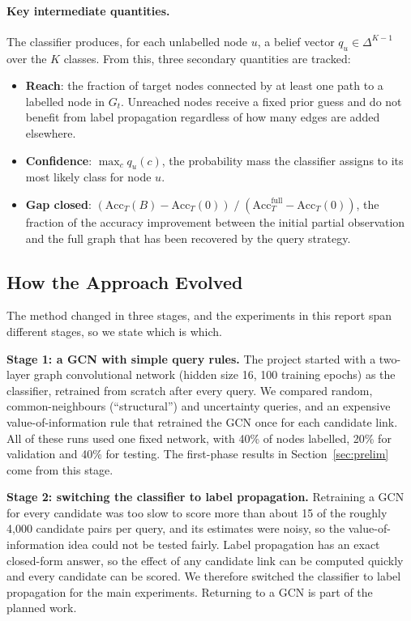 \documentclass[11pt,a4paper]{article}
\begin{document}
\paragraph{Key intermediate quantities.}
The classifier produces, for each unlabelled node $u$, a belief vector $q_u \in \Delta^{K-1}$
over the $K$ classes. From this, three secondary quantities are tracked:
\begin{itemize}[leftmargin=2em,itemsep=0.2em]
\item \textbf{Reach}: the fraction of target nodes connected by at least one path to a
labelled node in $G_t$. Unreached nodes receive a fixed prior guess and do not benefit from
label propagation regardless of how many edges are added elsewhere.
\item \textbf{Confidence}: $\max_c q_u(c)$, the probability mass the classifier assigns to
its most likely class for node $u$.
\item \textbf{Gap closed}: $({\mathrm{Acc}_T(B) - \mathrm{Acc}_T(0)}) \;/\; (\mathrm{Acc}_T^{\mathrm{full}} - \mathrm{Acc}_T(0))$,
the fraction of the accuracy improvement between the initial partial observation and the full
graph that has been recovered by the query strategy.
\end{itemize}

\subsection{How the Approach Evolved}
The method changed in three stages, and the experiments in this report span different
stages, so we state which is which.

\textbf{Stage 1: a GCN with simple query rules.} The project started with a two-layer graph
convolutional network (hidden size 16, 100 training epochs) as the classifier, retrained from
scratch after every query. We compared random, common-neighbours (``structural'') and
uncertainty queries, and an expensive value-of-information rule that retrained the GCN once for
each candidate link. All of these runs used one fixed network, with 40\% of nodes labelled, 20\%
for validation and 40\% for testing. The first-phase results in Section~\ref{sec:prelim} come from
this stage.

\textbf{Stage 2: switching the classifier to label propagation.} Retraining a GCN for every
candidate was too slow to score more than about 15 of the roughly 4,000 candidate pairs per
query, and its estimates were noisy, so the value-of-information idea could not be tested
fairly. Label propagation has an exact closed-form answer, so the effect of any candidate link
can be computed quickly and every candidate can be scored. We therefore switched the
classifier to label propagation for the main experiments. Returning to a GCN is part of the
planned work.
\end{document}
